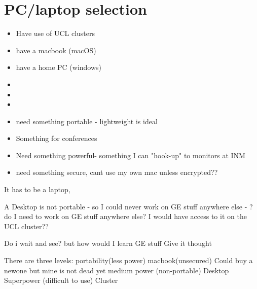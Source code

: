 \documentclass{article}
\begin{document}
\section{PC/laptop selection}

\begin{itemize}
\item Have use of UCL clusters
\item have a macbook (macOS)
\item have a home PC (windows)
\item 
\item 
\item 
\item need something portable - lightweight is ideal 
\item 	Something for conferences
\item Need something powerful- something I can "hook-up" to monitors at INM
\item need something secure, cant use my own mac unless encrypted?? 
\end{itemize}

It has to be a laptop,

A Desktop is not portable - so I could never work on GE stuff anywhere else - ?do I need to work on GE stuff anywhere else? I would have access to it on the UCL cluster??

Do i wait and see? 
 but how would I learn GE stuff
Give it thought

There are three levels: 
portability(less power)     					macbook(unsecured)		Could buy a newone but mine is not dead yet
medium power (non-portable)			   Desktop							  
Superpower (difficult to use)               Cluster





\end{document}
